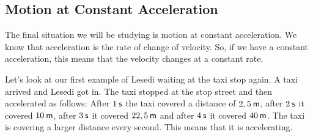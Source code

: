             \subsection*{Motion at Constant Acceleration}
            \nopagebreak
        \label{m38795*id71822}The final situation we will be studying is motion at constant acceleration. We know that acceleration is the rate of change of velocity. So, if we have a constant acceleration, this means that the velocity changes at a constant rate.\par 
        \label{m38795*id71827}Let's look at our first example of Lesedi waiting at the taxi stop again. A taxi arrived and Lesedi got in. The taxi stopped at the stop street and then accelerated as follows: After $1\phantom{\rule{2pt}{0ex}}\mathsf{s}$ the taxi covered a distance of $2,5\phantom{\rule{2pt}{0ex}}\mathsf{m}$, after $2\phantom{\rule{2pt}{0ex}}\mathsf{s}$ it covered $10\phantom{\rule{2pt}{0ex}}\mathsf{m}$, after $3\phantom{\rule{2pt}{0ex}}\mathsf{s}$ it covered $22,5\phantom{\rule{2pt}{0ex}}\mathsf{m}$ and after $4\phantom{\rule{2pt}{0ex}}\mathsf{s}$ it covered $40\phantom{\rule{2pt}{0ex}}\mathsf{m}$. The taxi is covering a larger distance every second. This means that it is accelerating.\par 
    \setcounter{subfigure}{0}
